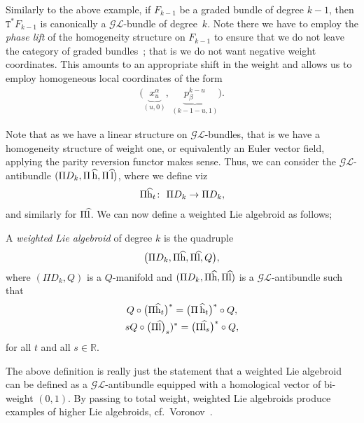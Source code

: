 \documentclass[10pt,a4paper]{amsart}
\newcommand{\rmh}{\textnormal{h}}
\newcommand{\rml}{\textnormal{l}}
\def\sT{{\mathtt T}}
\numberwithin{equation}{section}
\begin{document}
\begin{Example}
Similarly to the above example, if $F_{k-1}$ be a graded bundle of degree $k-1$, then $\sT^{*} F_{k-1}$ is canonically a $\mathcal{GL}$-bundle of degree~$k$. Note there we have to employ the \emph{phase lift} of the homogeneity structure on $F_{k-1}$ to ensure that we do not leave the category of graded bundles~\cite{Grabowski2013}; that is we do not want negative weight coordinates. This amounts to an appropriate shift in the weight and allows us to employ homogeneous local coordinates of the form
\begin{gather*}
\big(\underbrace{x^{\alpha}_{u}}_{(u,0)}, \, \underbrace{p_{\beta}^{k-u}}_{(k-1-u, 1)}\big).
\end{gather*}
\end{Example}
Note that as we have a linear structure on $\mathcal{GL}$-bundles, that is we have a homogeneity structure of weight one, or equivalently an Euler vector f\/ield, applying the parity reversion functor makes sense. Thus, we can consider the $\mathcal{GL}$-antibundle $(\Pi D_{k}, \Pi\,\widehat{\rmh}, \Pi\, \widehat{\rml})$, where we def\/ine viz
\begin{gather*}
\Pi \widehat {\rmh}_{t}\colon \ \Pi D_{k} \rightarrow \Pi D_{k},
\end{gather*}
\noindent and similarly for $\Pi  \widehat{\rml}$. We can now def\/ine a weighted Lie algebroid as follows;

\begin{Definition}
A \emph{weighted Lie algebroid} of degree $k$ is the quadruple
\begin{gather*}
\big(\Pi D_{k},\Pi \widehat{\rmh}, \Pi  \widehat{\rml}, Q\big ),
\end{gather*}
 where $(\Pi D_{k}, Q)$ is a $Q$-manifold and  $(\Pi D_{k},\Pi \widehat{\rmh}, \Pi \widehat{\rml})$ is a $\mathcal{GL}$-antibundle such that
\begin{gather}
\label{xx} Q \circ \big(\Pi \widehat{\rmh}_{t}\big)^{*}  =  \big(\Pi\,\widehat{\rmh}_{t}\big)^{*} \circ Q,\\
s   Q \circ \big(\Pi  \widehat{\rml}\big)_{s})^{*}  =  \big(\Pi \widehat{\rml}_{s}\big)^{*} \circ Q,\nonumber
\end{gather}
for all $t$  and all $s \in \mathbb{R}$.
\end{Definition}


The above def\/inition is really just the statement that a weighted Lie algebroid can be def\/ined as a $\mathcal{GL}$-antibundle equipped with a homological vector of bi-weight $(0,1)$.
By passing to total weight,  weighted Lie algebroids produce examples of higher Lie algebroids, cf.\ Voronov~\cite{voronov-2010}.
\end{document}
